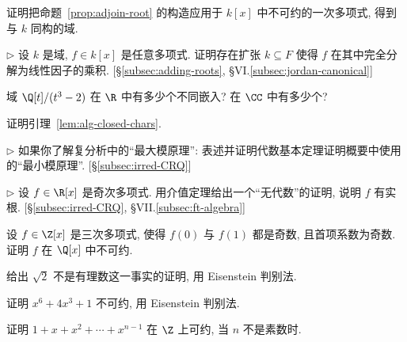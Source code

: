 \begin{prob}
\label{ex:linear-poly-adjoin}
证明把命题~\ref{prop:adjoin-root} 的构造应用于 $k[x]$ 中不可约的一次多项式, 得到与 $k$ 同构的域.
\end{prob}

\begin{prob}
\label{ex:splitting-extension}
$\triangleright$ 设 $k$ 是域, $f\in k[x]$ 是任意多项式. 证明存在扩张 $k\subseteq F$ 使得 $f$ 在其中完全分解为线性因子的乘积. [§\ref{subsec:adding-roots}, §VI.\ref{subsec:jordan-canonical}]
\end{prob}

\begin{prob}
\label{ex:embeddings-qt-cubert2}
域 $\Q[t]/(t^3-2)$ 在 $\R$ 中有多少个不同嵌入? 在 $\CC$ 中有多少个?
\end{prob}

\begin{prob}
\label{ex:prove-lem5.10}
证明引理~\ref{lem:alg-closed-chars}.
\end{prob}

\begin{prob}
\label{ex:min-modulus-principle}
$\triangleright$ 如果你了解复分析中的``最大模原理'': 表述并证明代数基本定理证明概要中使用的``最小模原理''. [§\ref{subsec:irred-CRQ}]
\end{prob}

\begin{prob}
\label{ex:odd-degree-ivt}
$\triangleright$ 设 $f\in\R[x]$ 是奇次多项式. 用介值定理给出一个``无代数''的证明, 说明 $f$ 有实根. [§\ref{subsec:irred-CRQ}, §VII.\ref{subsec:ft-algebra}]
\end{prob}

\begin{prob}
\label{ex:cubic-odd-values-irred}
设 $f\in\Z[x]$ 是三次多项式, 使得 $f(0)$ 与 $f(1)$ 都是奇数, 且首项系数为奇数. 证明 $f$ 在 $\Q[x]$ 中不可约.
\end{prob}

\begin{prob}
\label{ex:sqrt2-eisenstein}
给出 $\sqrt{2}$ 不是有理数这一事实的证明, 用 Eisenstein 判别法.
\end{prob}

\begin{prob}
\label{ex:x6+4x3+1-eisenstein}
证明 $x^6+4x^3+1$ 不可约, 用 Eisenstein 判别法.
\end{prob}

\begin{prob}
\label{ex:cyclotomic-reducible-nonprime}
证明 $1+x+x^2+\cdots+x^{n-1}$ 在 $\Z$ 上可约, 当 $n$ 不是素数时.
\end{prob}

